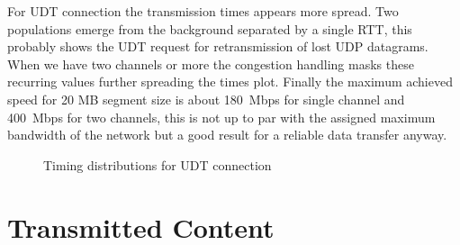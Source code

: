 \documentclass[10pt,a4paper]{article}
\begin{document}
For UDT connection the transmission times appears more spread.
Two populations emerge from the background separated by a single RTT, this probably shows the UDT request for retransmission of lost UDP datagrams.
When we have two channels or more the congestion handling masks these recurring values further spreading the times plot.
Finally the maximum achieved speed for 20 MB segment size is about 180~Mbps for single channel and 400~Mbps for two channels, this is not up to par with the assigned maximum bandwidth of the network but a good result for a reliable data transfer anyway.

\begin{figure}[ht]
\centerline{
}
\caption[]
{ Timing distributions for UDT connection }
\label{fig:distr-udt}
\end{figure}

\section{Transmitted Content}
\end{document}
